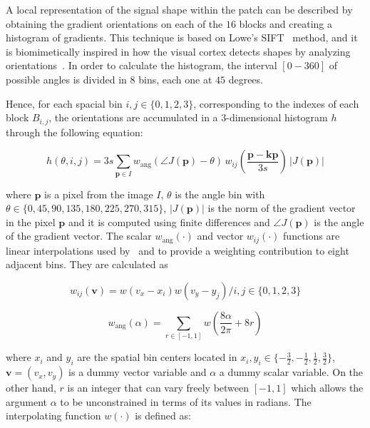 \documentclass[utf8]{frontiersSCNS} %
\begin{document}
A local representation of the signal shape within the patch can be described by obtaining the gradient orientations on each of the $16$ blocks and creating a histogram of gradients.  This technique is based on Lowe's SIFT~\citep{Lowe2004} method, and it is biomimetically inspired in how the visual cortex detects shapes by analyzing orientations~\citep{cogprints561}.   In order to calculate the histogram, the interval $[0-360]$ of possible angles is divided in $8$ bins, each one at $45$ degrees.

 Hence, for each spacial bin $ i,j \in \{0,1,2,3\} $, corresponding to the indexes of each block $B_{i,j}$,  the orientations are accumulated in a  $3$-dimensional histogram $h$ through the following equation: 
 

\begin{equation}
 h(\theta,i,j) = 3 s \sum_{\mathbf{p} \in I} w_\mathrm{ang}(\angle J(\mathbf{p}) - \theta)\, w_{ij}\left(\frac{\mathbf{p} - \mathbf{kp}}{3 s}\right)\, |J(\mathbf{p})|
\label{eq:histogram}
\end{equation}

\noindent  where $\mathbf{p}$ is a pixel from the image $I$,  $\theta$ is the angle bin with $ \theta \in \{0, 45, 90, 135, 180, 225, 270, 315\} $,  $ |J(\mathbf{p})| $ is the norm of the gradient vector in the pixel $\mathbf{p}$ and it is computed using finite differences and $\angle J(\mathbf{p}) $ is the angle of the gradient vector.  The scalar $ w_\mathrm{ang}(\cdot) $  and vector $ w_{ij}(\cdot) $ functions are linear interpolations used by~\cite{Lowe2004} and \cite{Vedaldi2010} to provide a weighting contribution to eight adjacent bins.  They are calculated as  

\begin{equation}
 w_{ij}(\mathbf{v}) = w( v_x - x_i ) w( v_y - y_j ) / i,j \in \{0,1,2,3\} 
\label{eq:ij}
\end{equation}

\begin{equation}
 w_\mathrm{ang}(\alpha) = \sum_{r \in  \left[ -1,1 \right] } w( \frac{8\alpha}{2\pi} + 8r)
\label{eq:wang}
\end{equation}

\noindent where $x_i$ and $y_i$ are the spatial bin centers located in $ x_i,y_i \in \{-\frac{3}{2},-\frac{1}{2},\frac{1}{2},\frac{3}{2}\} $, $\mathbf{v} = ( v_x, v_y ) $ is a dummy vector variable and $\alpha$ a dummy scalar variable.  On the other hand, $r$ is an integer that can vary freely between $ \left[ -1,1 \right]$ which allows the argument $\alpha$ to be unconstrained in terms of its values in radians. The interpolating function $w(\cdot)$ is defined as:
\end{document}
